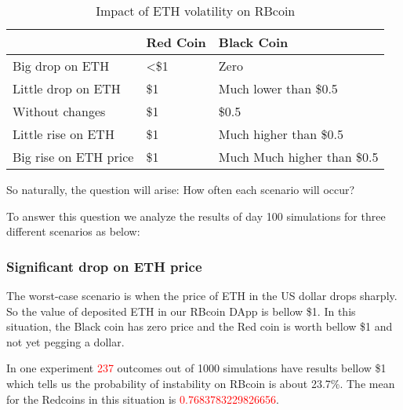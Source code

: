 \begin{table}[t]
\begin{tabular}{l|l|l|}
\cline{2-3}
                                                                & {\color[HTML]{000000} Red Coin} & Black Coin                  \\ \hline
\multicolumn{1}{|l|}{{\color[HTML]{000000} Big drop on ETH}}    & \textless{}\$1                  & Zero                        \\ \hline
\multicolumn{1}{|l|}{{\color[HTML]{000000} Little drop on ETH}} & \$1                             & Much lower than \$0.5       \\ \hline
\multicolumn{1}{|l|}{Without changes}                           & \$1                             & \$0.5                       \\ \hline
\multicolumn{1}{|l|}{Little rise on ETH}                        & \$1                             & Much higher than \$0.5      \\ \hline
\multicolumn{1}{|l|}{Big rise on ETH price}                     & \$1                             & Much Much higher than \$0.5 \\ \hline
\end{tabular}
\caption{Impact of ETH volatility on RBcoin}
\label{tbl1}
\end{table}

So naturally, the question will arise: How often each scenario will occur? 

To answer this question we analyze the results of day 100 simulations for three different scenarios as below:


\subsubsection{Significant drop on ETH price}
The worst-case scenario is when the price of ETH in the US dollar drops sharply. So the value of deposited ETH in our RBcoin DApp is bellow \$1. In this situation, the Black coin has zero price and the Red coin is worth bellow \$1 and not yet pegging a dollar. 

In one experiment \textcolor{red}{237} outcomes out of 1000 simulations have results bellow \$1 which tells us the probability of instability on RBcoin is about 23.7\%. The mean for the Redcoins in this situation is \textcolor{red}{0.7683783229826656}. 

